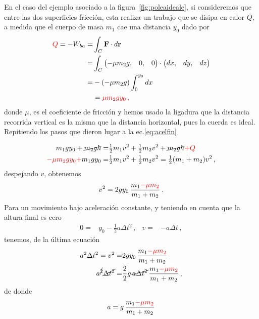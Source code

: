 En el caso del ejemplo asociado a la figura~\ref{fig:poleaideale}, si consideremos que entre las dos superficies fricción, esta realiza un trabajo que se disipa en calor $Q$, a medida que el cuerpo de masa $m_1$ cae una distancia $y_0$ dado por
\begin{align*}
    {\color{red}Q}=-W_{ba}=&\int_C \mathbf{F}\cdot d\mathbf{r}\nonumber\\
=&\int_C
\begin{pmatrix}
  -\mu m_2g,&0,&0
\end{pmatrix}\cdot
\begin{pmatrix}
dx,&dy,&dz  
\end{pmatrix}\nonumber\\
=&-(-\mu m_2 g)\int_0^{y_0}dx\nonumber\\
&={\color{red}\mu m_2g y_0\,,}
\end{align*}
donde $\mu$, es el coeficiente de fricción y hemos usado la ligadura
que la distancia recorrida vertical es la misma que la distancia
horizontal, pues la cuerda es ideal. Repitiendo los pasos que dieron
lugar a la ec.\eqref{eq:acelfin}


\begin{frame}
\begin{align*}
  m_1gy_0+\cancel{m_2gh}=&\tfrac{1}{2}m_1 v^2+\tfrac{1}{2}m_2 v^2+\cancel{m_2gh}{\color{red}+Q}\nonumber\\
 {\color{red}-\mu m_2 g y_0+}m_1gy_0=&\tfrac{1}{2}m_1 v^2+\tfrac{1}{2}m_2 v^2
  =\tfrac{1}{2}(m_1+m_2) v^2\,,
\end{align*}
despejando $v$, obtenemos
\begin{align*}
  v^2=2gy_0\,\frac{m_1{\color{red}-\mu m_2}}{m_1+m_2}\,.
\end{align*}
Para un movimiento bajo aceleración constante, y teniendo en cuenta que la altura final es cero
\begin{align*}
  0=&y_0-\tfrac{1}{2}a\Delta t^2\,,&
  v=&-a\Delta t\,,
\end{align*}
tenemos, de la última ecuación
\begin{align*}
  a^2 \Delta t^2=v^2
  =&2gy_0\,\frac{m_1{\color{red}-\mu m_2}}{m_1+m_2}\nonumber\\
  a^{\cancel{2}} \cancel{\Delta t^2}=&\frac{2}{2}g\,\cancel{a\Delta t^2}\,\frac{m_1{\color{red}-\mu m_2}}{m_1+m_2}\,,
\end{align*}
de donde
\begin{align}
\label{eq:acelfinmu}
  a=g\,\frac{m_1{\color{red}-\mu m_2}}{m_1+m_2}
\end{align}

\end{frame}


